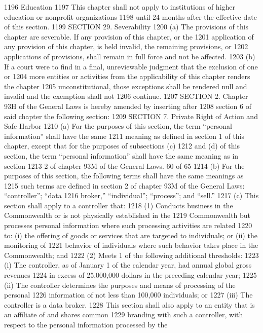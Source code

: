 1196 Education
1197 This chapter shall not apply to institutions of higher education or nonprofit organizations
1198 until 24 months after the effective date of this section.
1199 SECTION 29. Severability
1200 (a) The provisions of this chapter are severable. If any provision of this chapter, or the
1201 application of any provision of this chapter, is held invalid, the remaining provisions, or
1202 applications of provisions, shall remain in full force and not be affected.
1203 (b) If a court were to find in a final, unreviewable judgment that the exclusion of one or
1204 more entities or activities from the applicability of this chapter renders the chapter
1205 unconstitutional, those exceptions shall be rendered null and invalid and the exemption shall not
1206 continue.
1207 SECTION 2. Chapter 93H of the General Laws is hereby amended by inserting after
1208 section 6 of said chapter the following section:
1209 SECTION 7. Private Right of Action and Safe Harbor
1210 (a) For the purposes of this section, the term “personal information” shall have the same
1211 meaning as defined in section 1 of this chapter, except that for the purposes of subsections (c)
1212 and (d) of this section, the term “personal information” shall have the same meaning as in section
1213 2 of chapter 93M of the General Laws. 
60 of 65
1214 (b) For the purposes of this section, the following terms shall have the same meanings as
1215 such terms are defined in section 2 of chapter 93M of the General Laws: “controller”; “data
1216 broker,” “individual”; “process”; and “sell.”
1217 (c) This section shall apply to a controller that:
1218 (1) Conducts business in the Commonwealth or is not physically established in the
1219 Commonwealth but processes personal information where such processing activities are related
1220 to: (i) the offering of goods or services that are targeted to individuals; or (ii) the monitoring of
1221 behavior of individuals where such behavior takes place in the Commonwealth; and
1222 (2) Meets 1 of the following additional thresholds:
1223 (i) The controller, as of January 1 of the calendar year, had annual global gross revenues
1224 in excess of 25,000,000 dollars in the preceding calendar year;
1225 (ii) The controller determines the purposes and means of processing of the personal
1226 information of not less than 100,000 individuals; or
1227 (iii) The controller is a data broker.
1228 This section shall also apply to an entity that is an affiliate of and shares common
1229 branding with such a controller, with respect to the personal information processed by the
